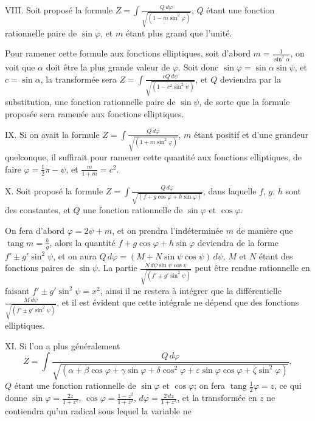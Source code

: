 \documentclass{article}
\begin{document}

VIII. Soit proposé la formule $Z=\displaystyle\int\frac{Q\,d\varphi}{\sqrt{(1-m\sin^{2}\varphi)}}$, $Q$ étant une fonction rationnelle paire de $\sin\varphi$, et $m$ étant plus grand que l'unité.

Pour ramener cette formule aux fonctions elliptiques, soit d'abord $m=\frac{1}{\sin^{2}\alpha}$, on voit que $\alpha$ doit être la plus grande valeur de $\varphi$. Soit donc $\sin\varphi=\sin\alpha\sin\psi$, et $c=\sin\alpha$, la transformée sera $Z=\displaystyle\int\frac{cQ\,d\psi}{\sqrt{(1-c^{2}\sin^{2}\psi)}}$, et $Q$ deviendra par la substitution, une fonction rationnelle paire de $\sin\psi$, de sorte que la formule proposée sera ramenée aux fonctions elliptiques.

IX. Si on avait la formule $Z=\displaystyle\int\frac{Q\,d\varphi}{\sqrt{(1+m\sin^{2}\varphi)}}$, $m$ étant positif et d'une grandeur quelconque, il suffirait pour ramener cette quantité aux fonctions elliptiques, de faire $\varphi=\frac{1}{2}\pi-\psi$, et $\frac{m}{1+m}=c^{2}$.

X. Soit proposé la formule $Z=\displaystyle\int\frac{Q\,d\varphi}{\sqrt{(f+g\cos\varphi+h\sin\varphi)}}$, dans laquelle $f$, $g$, $h$ sont des constantes, et $Q$ une fonction rationnelle de $\sin\varphi$ et $\cos\varphi$.

On fera d'abord $\varphi=2\psi+m$, et on prendra l'indéterminée $m$ de manière que $\operatorname{tang}m=\frac{h}{g}$, alors la quantité $f+g\cos\varphi+h\sin\varphi$ deviendra de la forme $f'\pm g'\sin^{2}\psi$, et on aura $Q\,d\varphi=(M+N\sin\psi\cos\psi)\,d\psi$, $M$ et $N$ étant des fonctions paires de $\sin\psi$. La partie $\frac{N\,d\psi\sin\psi\cos\psi}{\sqrt{(f'\pm g'\sin^{2}\psi)}}$ peut être rendue rationnelle en faisant $f'\pm g'\sin^{2}\psi=x^{2}$, ainsi il ne restera à intégrer que la différentielle $\frac{M\,d\psi}{\sqrt{(f'\pm g'\sin^{2}\psi)}}$, et il est évident que cette intégrale ne dépend que des fonctions elliptiques.

XI. Si l'on a plus généralement
\[ Z=\int\frac{Q\,d\varphi}{\sqrt{(\alpha+\beta\cos\varphi+\gamma\sin\varphi+\delta\cos^{2}\varphi+\varepsilon\sin\varphi\cos\varphi+\zeta\sin^{2}\varphi)}}, \]
$Q$ étant une fonction rationnelle de $\sin\varphi$ et $\cos\varphi$; on fera $\operatorname{tang}\frac{1}{2}\varphi=z$, ce qui donne $\sin\varphi=\frac{2z}{1+z^{2}}$, $\cos\varphi=\frac{1-z^{2}}{1+z^{2}}$, $d\varphi=\frac{2\,dz}{1+z^{2}}$, et la transformée en $z$ ne contiendra qu'un radical sous lequel la variable ne
\end{document}
